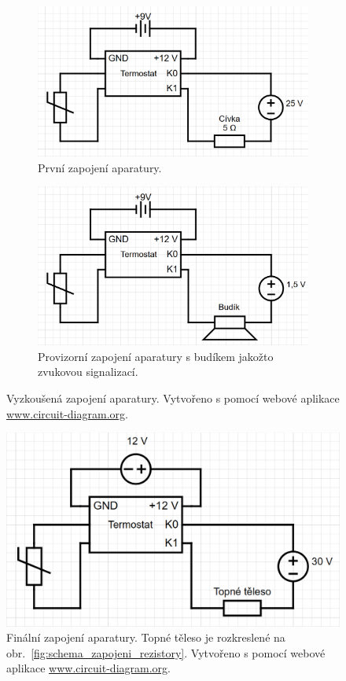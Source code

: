 \documentclass[12pt]{article}
\begin{document}
\begin{figure}[h!]
    \begin{subfigure}[b]{.5\textwidth}
        \includegraphics[width = \textwidth]{figures/zapojeni_1.png}
        \caption{První zapojení aparatury.}
    \end{subfigure}
    \hfill
    \begin{subfigure}[b]{.5\textwidth}
        \includegraphics[width = \textwidth]{figures/zapojeni_2.png}
        \caption{Provizorní zapojení aparatury s budíkem jakožto zvukovou signalizací.}
    \end{subfigure}
    \caption{Vyzkoušená zapojení aparatury. Vytvořeno s pomocí webové aplikace \url{www.circuit-diagram.org}.}
    \label{fig:zapojeni_prvni}
\end{figure}
\begin{figure}[h!]
    \centering
    \includegraphics[width = 0.5\linewidth]{figures/zapojeni_3.png}
    \caption{Finální zapojení aparatury. Topné těleso je rozkreslené na obr.~\ref{fig:schema_zapojeni_rezistory}. Vytvořeno s pomocí webové aplikace \url{www.circuit-diagram.org}.}
    \label{fig:zapojeni_final}
\end{figure}
\end{document}
